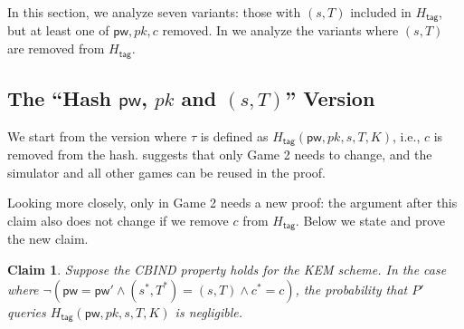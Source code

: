 \documentclass{article}
\theoremstyle{plain}
\newtheorem{claim}{Claim}
\theoremstyle{definition}
\theoremstyle{remark}
\newcommand{\Htag}{H_\mathsf{tag}}
\newcommand{\pw}{\mathsf{pw}}
\begin{document}
In this section, we analyze seven variants: those with $(s,T)$ included in $\Htag$, but at least one of $\pw,pk,c$ removed. In  we analyze the variants where $(s,T)$ are removed from $\Htag$.

\subsection{The ``Hash $\pw$, $pk$ and $(s,T)$'' Version}
\label{sec:hash-pw-pk-st}
We start from the version where $\tau$ is defined as $\Htag(\pw,pk,s,T,K)$, i.e., $c$ is removed from the hash.  suggests that only Game 2 needs to change, and the simulator and all other games can be reused in the proof.

Looking more closely, only  in Game 2 needs a new proof: the argument after this claim also does not change if we remove $c$ from $\Htag$. Below we state and prove the new claim.
\begin{claim}
\label{clm:htag2}
Suppose the CBIND property holds for the KEM scheme. In the case where $\neg(\pw = \pw' \land (s^*,T^*) = (s,T) \land c^* = c)$, the probability that $P'$ queries $\Htag(\pw,pk,s,T,K)$ is negligible.
\end{claim}
\end{document}
